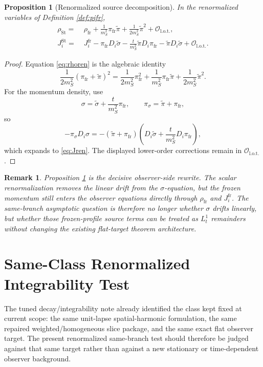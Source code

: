 \documentclass[11pt]{article}
\newtheorem{proposition}{Proposition}
\newtheorem{remark}{Remark}
\begin{document}
\begin{proposition}[Renormalized source decomposition]
\label{prop:sourcedecomp}
In the renormalized variables of Definition \ref{def:pifr},
\begin{align}
\rho_{\mathrm{St}}
=\;&
\rho_{\mathrm{fr}}
+\frac{1}{m_S^2}\pi_{\mathrm{fr}}\widetilde{\pi}
+\frac{1}{2m_S^2}\widetilde{\pi}^2
+\mathcal O_{\mathrm{l.o.t.}},
\label{eq:rhoren}
\\
J_i^{\mathrm{St}}
=\;&
J_i^{\mathrm{fr}}
-\pi_{\mathrm{fr}}D_i\widetilde{\sigma}
-\frac{t}{m_S^2}\widetilde{\pi}D_i\pi_{\mathrm{fr}}
-\widetilde{\pi}D_i\widetilde{\sigma}
+\mathcal O_{\mathrm{l.o.t.}}.
\label{eq:Jren}
\end{align}
\end{proposition}

\begin{proof}
Equation \eqref{eq:rhoren} is the algebraic identity
\[
\frac{1}{2m_S^2}(\pi_{\mathrm{fr}}+\widetilde{\pi})^2
=
\frac{1}{2m_S^2}\pi_{\mathrm{fr}}^2
+\frac{1}{m_S^2}\pi_{\mathrm{fr}}\widetilde{\pi}
+\frac{1}{2m_S^2}\widetilde{\pi}^2.
\]
For the momentum density, use
\[
\sigma
=
\widetilde{\sigma}
+\frac{t}{m_S^2}\pi_{\mathrm{fr}},
\qquad
\pi_\sigma
=
\widetilde{\pi}+\pi_{\mathrm{fr}},
\]
so
\[
-\pi_\sigma D_i\sigma
=
-(\widetilde{\pi}+\pi_{\mathrm{fr}})
\left(
D_i\widetilde{\sigma}
+\frac{t}{m_S^2}D_i\pi_{\mathrm{fr}}
\right),
\]
which expands to \eqref{eq:Jren}. The displayed lower-order corrections remain in \(\mathcal O_{\mathrm{l.o.t.}}\).
\end{proof}

\begin{remark}
Proposition \ref{prop:sourcedecomp} is the decisive observer-side rewrite. The scalar renormalization removes the linear drift from the \(\sigma\)-equation, but the frozen momentum still enters the observer equations directly through \(\rho_{\mathrm{fr}}\) and \(J_i^{\mathrm{fr}}\). The same-branch asymptotic question is therefore no longer whether \(\sigma\) drifts linearly, but whether those frozen-profile source terms can be treated as \(L_t^1\) remainders without changing the existing flat-target theorem architecture.
\end{remark}

\section{Same-Class Renormalized Integrability Test}

The tuned decay/integrability note already identified the class kept fixed at current scope: the same unit-lapse spatial-harmonic formulation, the same repaired weighted/homogeneous slice package, and the same exact flat observer target. The present renormalized same-branch test should therefore be judged against that same target rather than against a new stationary or time-dependent observer background.
\end{document}
